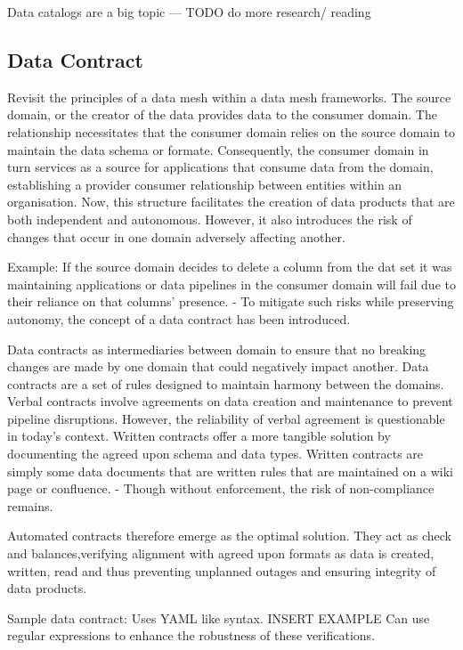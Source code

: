 \documentclass[a4paper, 11pt]{article}
\begin{document}
    Data catalogs are a big topic --- TODO do more research/ reading

    \subsection{Data Contract}
    Revisit the principles of a data mesh within a data mesh frameworks.
    The source domain, or the creator of the data provides data to the consumer domain.
    The relationship necessitates that the consumer domain relies on the source domain to maintain the data schema or formate.
    Consequently, the consumer domain in turn services as a source for applications that consume data from the domain, establishing a provider consumer relationship between entities within an organisation.
    Now, this structure facilitates the creation of data products that are both independent and autonomous.
    However, it also introduces the risk of changes that occur in one domain adversely affecting another.

    Example:
    If the source domain decides to delete a column from the dat set it was maintaining applications or data pipelines in the consumer domain will fail due to their reliance on that columns' presence.
    - To mitigate such risks while preserving autonomy, the concept of a data contract has been introduced.

    Data contracts as intermediaries between domain to ensure that no breaking changes are made by one domain that could negatively impact another.
    Data contracts are a set of rules designed to maintain harmony between the domains.
    Verbal contracts involve agreements on data creation and maintenance to prevent pipeline disruptions.
    However, the reliability of verbal agreement is questionable in today's context.
    Written contracts offer a more tangible solution by documenting the agreed upon schema and data types.
    Written contracts are simply some data documents that are written rules that are maintained on a wiki page or confluence.
    - Though without enforcement, the risk of non-compliance remains.

    Automated contracts therefore emerge as the optimal solution.
    They act as check and balances,verifying alignment with agreed upon formats as data is created, written, read and thus preventing unplanned outages and ensuring integrity of data products.

    Sample data contract:
    Uses YAML like syntax.
    INSERT EXAMPLE
    Can use regular expressions to enhance the robustness of these verifications.
\end{document}
